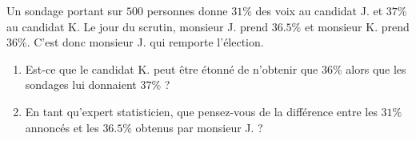 
\begin{exercice}\label{exosmath-0417}

    Un sondage portant sur \( 500\) personnes donne \( 31\%\) des voix au candidat J. et \( 37\%\) au candidat K. Le jour du scrutin, monsieur J. prend \(36.5\% \) et monsieur K. prend \( 36\%\). C'est donc monsieur J. qui remporte l'élection.
    \begin{enumerate}
        \item
            Est-ce que le candidat K. peut être étonné de n'obtenir que \( 36\%\) alors que les sondages lui donnaient \( 37\%\) ?
        \item
            En tant qu'expert statisticien, que pensez-vous de la différence entre les \( 31\%\) annoncés et les \( 36.5\%\) obtenus par monsieur J. ?
    \end{enumerate}

\end{exercice}
